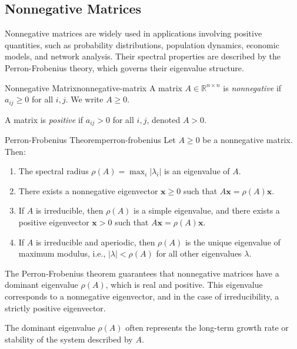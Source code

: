 \subsection{Nonnegative Matrices}
Nonnegative matrices are widely used in applications involving positive quantities, such as probability distributions, population dynamics, economic models, and network analysis. Their spectral properties are described by the Perron-Frobenius theory, which governs their eigenvalue structure.

\begin{definition}{Nonnegative Matrix}{nonnegative-matrix}
    A matrix $A \in \mathbb{R}^{n \times n}$ is \emph{nonnegative} if $a_{ij} \geq 0$ for all $i, j$. We write $A \geq 0$.

    A matrix is \emph{positive} if $a_{ij} > 0$ for all $i, j$, denoted $A > 0$.
\end{definition}

\begin{theorem}{Perron-Frobenius Theorem}{perron-frobenius}
    Let $A \geq 0$ be a nonnegative matrix. Then:
    \begin{enumerate}
        \item The spectral radius $\rho(A) = \max_i |\lambda_i|$ is an eigenvalue of $A$.
        \item There exists a nonnegative eigenvector $\mathbf{x} \geq 0$ such that $A\mathbf{x} = \rho(A)\mathbf{x}$.
        \item If $A$ is irreducible, then $\rho(A)$ is a simple eigenvalue, and there exists a positive eigenvector $\mathbf{x} > 0$ such that $A\mathbf{x} = \rho(A)\mathbf{x}$.
        \item If $A$ is irreducible and aperiodic, then $\rho(A)$ is the unique eigenvalue of maximum modulus, i.e., $|\lambda| < \rho(A)$ for all other eigenvalues $\lambda$.
    \end{enumerate}
\end{theorem}

The Perron-Frobenius theorem guarantees that nonnegative matrices have a dominant eigenvalue $\rho(A)$, which is real and positive.
This eigenvalue corresponds to a nonnegative eigenvector, and in the case of irreducibility, a strictly positive eigenvector.

The dominant eigenvalue $\rho(A)$ often represents the long-term growth rate or stability of the system described by $A$.


